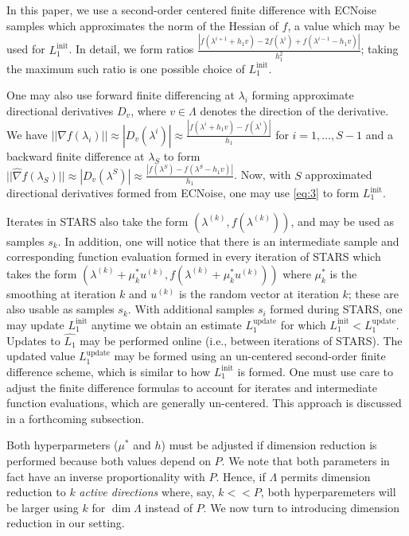\documentclass{amsart}
\begin{document}
In this paper, we use a second-order centered finite difference with ECNoise samples which approximates the norm of the Hessian of $f$, a value which may be used for $L_1^\text{init}$. In detail, we form ratios $\frac{|f(\lambda^{i+1}+h_1 v)-2f(\lambda^{i})+f(\lambda^{i-1}-h_1 v)|}{h_1^2}$; taking the maximum such ratio is one possible choice of $L_1^\text{init}$.

One may also use forward finite differencing at $\lambda_i$ forming approximate directional derivatives $D_v$, where $v \in \Lambda$ denotes the direction of the derivative.  We have $||\hat{\nabla }f(\lambda_i)||\approx |D_v (\lambda^i)|\approx\frac{|f(\lambda^{i}+h_1 v)-f(\lambda^{i})|}{h_1}$ for $i=1,\ldots,S-1$ and a backward finite difference at $\lambda_S$ to form $||\hat{\nabla }f(\lambda_S)|| \approx |D_v(\lambda^S)|\approx\frac{|f(\lambda^{S})-f(\lambda^{S}-h_1 v)|}{h_1}$. Now, with $S$ approximated directional derivatives formed from ECNoise, one may use \eqref{eq:3} to form $L_1^\text{init}$.

Iterates in STARS also take the form $(\lambda^{(k)}, f(\lambda^{(k)}))$, and may be used as samples $s_k$. In addition, one will notice that there is an intermediate sample and corresponding function evaluation formed in every iteration of STARS which takes the form $(\lambda^{(k)}+\mu^*_k u^{(k)}, f(\lambda^{(k)}+\mu^*_k u^{(k)}))$ where $\mu^*_k$ is the smoothing at iteration $k$ and $u^{(k)}$ is the random vector at iteration $k$; these are also usable as samples $s_k$. With additional samples $s_i$ formed during STARS, one may update $L_1^\text{init}$ anytime we obtain an estimate $L_1^\text{update}$ for which $L_1^\text{init}<L_1^\text{update}$. Updates to $\hat{L_1}$ may be performed online (i.e., between iterations of STARS). The updated value $L_1^\text{update}$ may be formed using an un-centered second-order finite difference scheme, which is similar to how $L_1^\text{init}$ is formed. One must use care to adjust the finite difference formulas to account for iterates and intermediate function evaluations, which are generally un-centered. This approach is discussed in a forthcoming subsection.

Both hyperparmeters ($\mu^*$ and $h$) must be adjusted if dimension reduction is performed because both values depend on $P$. We note that both parameters in fact have an inverse proportionality with $P$. Hence, if $\Lambda$ permits dimension reduction to $k$ \textit{active directions} where, say, $k<<P$, both hyperparemeters will be larger using $k$ for $\dim \Lambda$ instead of $P.$  We now turn to introducing dimension reduction in our setting.
\end{document}
